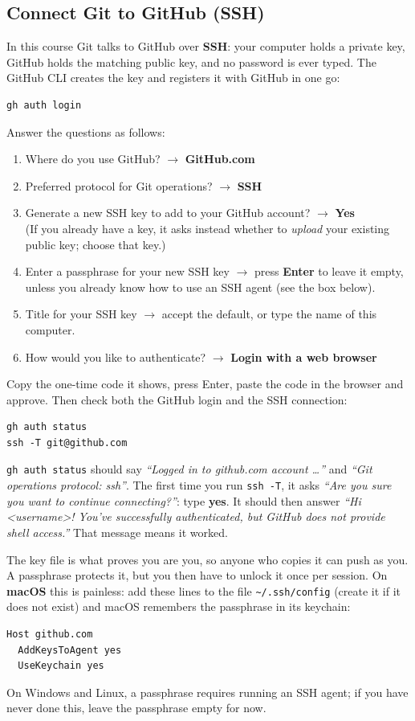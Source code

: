 \documentclass[11pt,a4paper]{article}
\newcommand{\cmd}[1]{\texttt{#1}}
\begin{document}
\subsection{Connect Git to GitHub (SSH)}\label{sec:ssh}
In this course Git talks to GitHub over \textbf{SSH}: your computer holds a private
key, GitHub holds the matching public key, and no password is ever typed. The GitHub
CLI creates the key and registers it with GitHub in one go:
\begin{lstlisting}
gh auth login
\end{lstlisting}
Answer the questions as follows:
\begin{enumerate}
  \item Where do you use GitHub? $\to$ \textbf{GitHub.com}
  \item Preferred protocol for Git operations? $\to$ \textbf{SSH}
  \item Generate a new SSH key to add to your GitHub account? $\to$ \textbf{Yes}\\
        (If you already have a key, it asks instead whether to \emph{upload} your
        existing public key; choose that key.)
  \item Enter a passphrase for your new SSH key $\to$ press \textbf{Enter} to leave it
        empty, unless you already know how to use an SSH agent (see the box below).
  \item Title for your SSH key $\to$ accept the default, or type the name of this
        computer.
  \item How would you like to authenticate? $\to$ \textbf{Login with a web browser}
\end{enumerate}
Copy the one-time code it shows, press Enter, paste the code in the browser and
approve. Then check both the GitHub login and the SSH connection:
\begin{lstlisting}
gh auth status
ssh -T git@github.com
\end{lstlisting}
\cmd{gh auth status} should say \emph{``Logged in to github.com account \ldots''} and
\emph{``Git operations protocol: ssh''}. The first time you run \cmd{ssh -T}, it asks
\emph{``Are you sure you want to continue connecting?''}: type \textbf{yes}. It should
then answer \emph{``Hi \textless username\textgreater! You've successfully
authenticated, but GitHub does not provide shell access.''} That message means it
worked.

\begin{note}
The key file is what proves you are you, so anyone who copies it can push as you.
A passphrase protects it, but you then have to unlock it once per session.
On \textbf{macOS} this is painless: add these lines to the file \cmd{\textasciitilde/.ssh/config}
(create it if it does not exist) and macOS remembers the passphrase in its keychain:
\begin{lstlisting}
Host github.com
  AddKeysToAgent yes
  UseKeychain yes
\end{lstlisting}
On Windows and Linux, a passphrase requires running an SSH agent; if you have never
done this, leave the passphrase empty for now.
\end{note}
\end{document}
